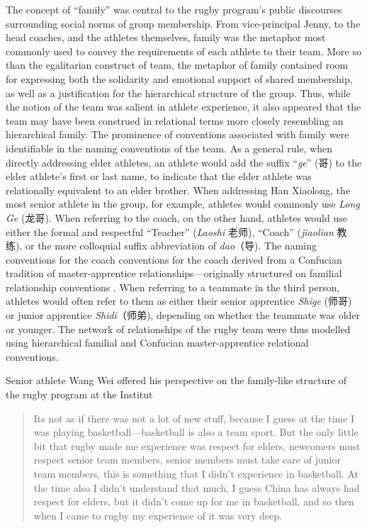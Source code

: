 \begin{CJK}{UTF8}{gbsn}
The concept of ``family'' was central to the rugby program's public discourses surrounding social norms of group membership.
From vice-principal Jenny, to the head coaches, and the athletes themselves, family was the metaphor most commonly used to convey the requirements of each athlete to their team.  More so than the egalitarian construct of team, the metaphor of family contained room for expressing both the solidarity and emotional support of shared membership, as well as a justification for the hierarchical structure of the group.  Thus, while the notion of the team was salient in athlete experience, it also appeared that the team may have been construed in relational terms more closely resembling an hierarchical family.  The prominence of conventions associated with family were identifiable in the naming conventions of the team.  As a general rule, when directly addressing elder athletes, an athlete would add the suffix ``\textit{ge}'' (哥) to the elder athlete's first or last name, to indicate that the elder athlete was relationally equivalent to an elder brother.  When addressing Han Xiaolong, the most senior athlete in the group, for example, athletes would commonly use \textit{Long Ge} (龙哥).  When referring to the coach, on the other hand, athletes would use either the formal and respectful ``Teacher'' (\textit{Laoshi} 老师), ``Coach'' (\textit{jiaolian} 教练), or the more colloquial suffix abbreviation of \textit{dao}（导).  The naming conventions for the coach conventions for the coach derived from a Confucian tradition of master-apprentice relationships---originally structured on familial relationship conventions \citep{Spence1999}.
When referring to a teammate in the third person, athletes would often refer to them as either their senior apprentice \textit{Shige} (师哥) or junior apprentice \textit{Shidi}（师弟), depending on whether the teammate was older or younger.  The network of relationships of the rugby team were thus modelled using hierarchical familial and Confucian master-apprentice relational conventions.

Senior athlete Wang Wei offered his perspective on the family-like structure of the rugby program at the Institut

    \begin{quote}
      Its not as if there was not a lot of new stuff, because I guess at the time I was playing basketball---basketball is also a team sport.  But the only little bit that rugby made me experience was respect for elders, newcomers must respect senior team members, senior members must take care of junior team members, this is something that I didn't experience in basketball.  At the time also I didn't understand that much, I guess China has always had respect for elders, but it didn't come up for me in basketball, and so then when I came to rugby my experience of it was very deep.
    \end{quote}


\end{CJK}
